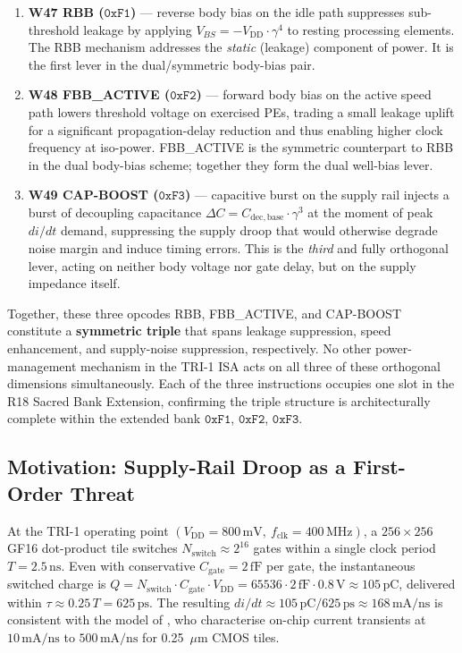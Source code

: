 \documentclass[12pt,a4paper]{report}
\theoremstyle{plain}
\theoremstyle{definition}
\theoremstyle{remark}
\newcommand{\Vdd}{V_{\mathrm{DD}}}
\newcommand{\Cbase}{C_{\mathrm{dec,base}}}
\newcommand{\deltaC}{\Delta C}
\newcommand{\fclk}{f_{\mathrm{clk}}}
\begin{document}
\begin{enumerate}[leftmargin=1.5em]
  \item \textbf{W47 RBB ($\texttt{0xF1}$)} — reverse body bias on the idle
    path suppresses sub-threshold leakage by applying
    $V_{BS} = -\Vdd \cdot \gamma^{4}$ to resting processing elements.
    The RBB mechanism addresses the \emph{static} (leakage) component of
    power. It is the first lever in the dual/symmetric body-bias pair.
  \item \textbf{W48 FBB\_ACTIVE ($\texttt{0xF2}$)} — forward body bias on
    the active speed path lowers threshold voltage on exercised PEs, trading
    a small leakage uplift for a significant propagation-delay reduction and
    thus enabling higher clock frequency at iso-power.
    FBB\_ACTIVE is the symmetric counterpart to RBB in the
    dual body-bias scheme; together they form the dual well-bias lever.
  \item \textbf{W49 CAP-BOOST ($\texttt{0xF3}$)} — capacitive burst on the
    supply rail injects a burst of decoupling capacitance
    $\deltaC = \Cbase \cdot \gamma^{3}$ at the moment of peak
    $di/dt$ demand, suppressing the supply droop that would otherwise degrade
    noise margin and induce timing errors.
    This is the \emph{third} and fully orthogonal lever, acting on neither
    body voltage nor gate delay, but on the supply impedance itself.
\end{enumerate}

Together, these three opcodes RBB, FBB\_ACTIVE, and CAP-BOOST constitute a
\textbf{symmetric triple} that spans leakage suppression, speed enhancement,
and supply-noise suppression, respectively.
No other power-management mechanism in the TRI-1 ISA acts on all three of
these orthogonal dimensions simultaneously.
Each of the three instructions occupies one slot in the R18 Sacred Bank
Extension, confirming the triple structure is architecturally complete within
the extended bank $\texttt{0xF1}$, $\texttt{0xF2}$, $\texttt{0xF3}$.

\subsection{Motivation: Supply-Rail Droop as a First-Order Threat}
\label{ssec:droop-motivation}

At the TRI-1 operating point
$(\Vdd = 800\,\mathrm{mV},\ \fclk = 400\,\mathrm{MHz})$,
a $256 \times 256$ GF16 dot-product tile switches
$N_{\mathrm{switch}} \approx 2^{16}$ gates within a single clock period
$T = 2.5\,\mathrm{ns}$.
Even with conservative $C_{\mathrm{gate}} = 2\,\mathrm{fF}$ per gate, the
instantaneous switched charge is
$Q = N_{\mathrm{switch}} \cdot C_{\mathrm{gate}} \cdot \Vdd
    = 65536 \cdot 2\,\mathrm{fF} \cdot 0.8\,\mathrm{V}
    \approx 105\,\mathrm{pC}$,
delivered within $\tau \approx 0.25\,T = 625\,\mathrm{ps}$.
The resulting $di/dt \approx 105\,\mathrm{pC} / 625\,\mathrm{ps} \approx
168\,\mathrm{mA/ns}$ is consistent with the model of
\citep{larsson_svensson_1994}, who characterise on-chip current transients
at $10\,\mathrm{mA/ns}$ to $500\,\mathrm{mA/ns}$ for 0.25~$\mu$m CMOS tiles.
\end{document}
